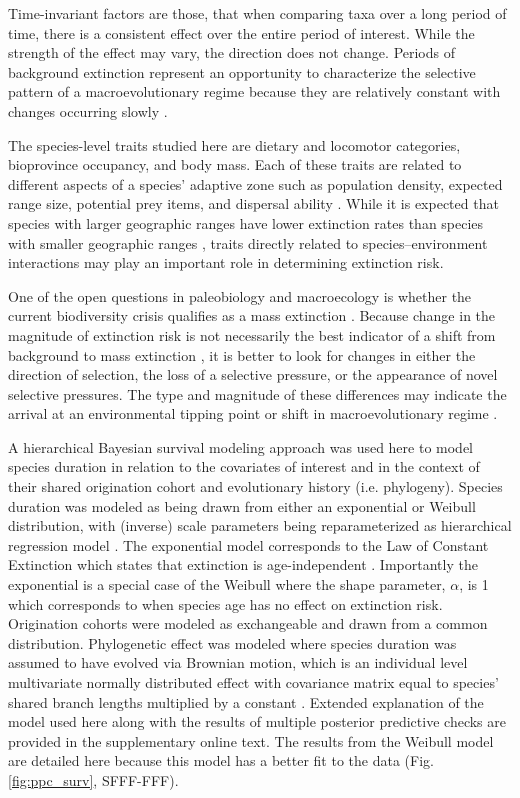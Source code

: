 \documentclass[12pt]{article}
\begin{document}
Time-invariant factors are those, that when comparing taxa over a long period of time, there is a consistent effect over the entire period of interest. While the strength of the effect may vary, the direction does not change. Periods of background extinction represent an opportunity to characterize the selective pattern of a macroevolutionary regime because they are relatively constant with changes occurring slowly \cite{Jablonski1986,Raup1988}.

The species-level traits studied here are dietary and locomotor categories, bioprovince occupancy, and body mass. Each of these traits are related to different aspects of a species' adaptive zone such as population density, expected range size, potential prey items, and dispersal ability \cite{Smith2004,Jernvall2004}. While it is expected that species with larger geographic ranges have lower extinction rates than species with smaller geographic ranges \cite{Jablonski1986,Roy2009c}, traits directly related to species--environment interactions may play an important role in determining extinction risk.

One of the open questions in paleobiology and macroecology is whether the current biodiversity crisis qualifies as a mass extinction \cite{Alroy2010,Barnosky2011,Barnosky2012a}. Because change in the magnitude of extinction risk is not necessarily the best indicator of a shift from background to mass extinction \cite{Wang2003}, it is better to look for changes in either the direction of selection, the loss of a selective pressure, or the appearance of novel selective pressures. The type and magnitude of these differences may indicate the arrival at an environmental tipping point or shift in macroevolutionary regime \cite{Jablonski1986}.

A hierarchical Bayesian survival modeling approach was used here to model species duration in relation to the covariates of interest and in the context of their shared origination cohort and evolutionary history (i.e. phylogeny). Species duration was modeled as being drawn from either an exponential or Weibull distribution, with (inverse) scale parameters being reparameterized as hierarchical regression model \cite{Gelman2013d}. The exponential model corresponds to the Law of Constant Extinction which states that extinction is age-independent \cite{VanValen1973}. Importantly the exponential is a special case of the Weibull where the shape parameter, $\alpha$, is 1 which corresponds to when species age has no effect on extinction risk. Origination cohorts were modeled as exchangeable and drawn from a common distribution. Phylogenetic effect was modeled where species duration was assumed to have evolved via Brownian motion, which is an individual level multivariate normally distributed effect with covariance matrix equal to species' shared branch lengths multiplied by a constant \cite{Lynch1991}. Extended explanation of the model used here along with the results of multiple posterior predictive checks are provided in the supplementary online text. The results from the Weibull model are detailed here because this model has a better fit to the data (Fig. \ref{fig:ppc_surv}, SFFF-FFF).
\end{document}
